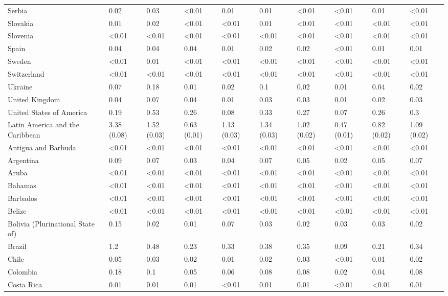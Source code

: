 \begin{longtable}[t]{llllllllll}
Serbia & 0.02 & 0.03 & <0.01 & 0.01 & 0.01 & <0.01 & <0.01 & 0.01 & <0.01\\
Slovakia & 0.01 & 0.02 & <0.01 & <0.01 & 0.01 & <0.01 & <0.01 & <0.01 & <0.01\\
Slovenia & <0.01 & <0.01 & <0.01 & <0.01 & <0.01 & <0.01 & <0.01 & <0.01 & <0.01\\
\addlinespace
Spain & 0.04 & 0.04 & 0.04 & 0.01 & 0.02 & 0.02 & <0.01 & 0.01 & 0.01\\
Sweden & <0.01 & 0.01 & <0.01 & <0.01 & <0.01 & <0.01 & <0.01 & <0.01 & <0.01\\
Switzerland & <0.01 & <0.01 & <0.01 & <0.01 & <0.01 & <0.01 & <0.01 & <0.01 & <0.01\\
Ukraine & 0.07 & 0.18 & 0.01 & 0.02 & 0.1 & 0.02 & 0.01 & 0.04 & 0.02\\
United Kingdom & 0.04 & 0.07 & 0.04 & 0.01 & 0.03 & 0.03 & 0.01 & 0.02 & 0.03\\
\addlinespace
United States of America & 0.19 & 0.53 & 0.26 & 0.08 & 0.33 & 0.27 & 0.07 & 0.26 & 0.3\\
Latin America and the Caribbean & 3.38 (0.08) & 1.52 (0.03) & 0.63 (0.01) & 1.13 (0.03) & 1.34 (0.03) & 1.02 (0.02) & 0.47 (0.01) & 0.82 (0.02) & 1.09 (0.02)\\
Antigua and Barbuda & <0.01 & <0.01 & <0.01 & <0.01 & <0.01 & <0.01 & <0.01 & <0.01 & <0.01\\
Argentina & 0.09 & 0.07 & 0.03 & 0.04 & 0.07 & 0.05 & 0.02 & 0.05 & 0.07\\
Aruba & <0.01 & <0.01 & <0.01 & <0.01 & <0.01 & <0.01 & <0.01 & <0.01 & <0.01\\
\addlinespace
Bahamas & <0.01 & <0.01 & <0.01 & <0.01 & <0.01 & <0.01 & <0.01 & <0.01 & <0.01\\
Barbados & <0.01 & <0.01 & <0.01 & <0.01 & <0.01 & <0.01 & <0.01 & <0.01 & <0.01\\
Belize & <0.01 & <0.01 & <0.01 & <0.01 & <0.01 & <0.01 & <0.01 & <0.01 & <0.01\\
Bolivia (Plurinational State of) & 0.15 & 0.02 & 0.01 & 0.07 & 0.03 & 0.02 & 0.03 & 0.03 & 0.02\\
Brazil & 1.2 & 0.48 & 0.23 & 0.33 & 0.38 & 0.35 & 0.09 & 0.21 & 0.34\\
\addlinespace
Chile & 0.05 & 0.03 & 0.02 & 0.01 & 0.02 & 0.03 & <0.01 & 0.01 & 0.02\\
Colombia & 0.18 & 0.1 & 0.05 & 0.06 & 0.08 & 0.08 & 0.02 & 0.04 & 0.08\\
Costa Rica & 0.01 & 0.01 & 0.01 & <0.01 & 0.01 & 0.01 & <0.01 & <0.01 & 0.01\\

\end{longtable}
